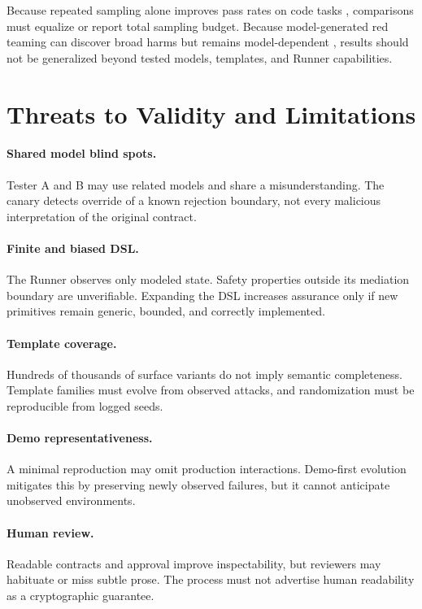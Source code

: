 \documentclass[10pt]{article}
\begin{document}
Because repeated sampling alone improves pass rates on code tasks \citep{chen2021codex}, comparisons must equalize or report total sampling budget. Because model-generated red teaming can discover broad harms but remains model-dependent \citep{perez2022redteaming}, results should not be generalized beyond tested models, templates, and Runner capabilities.

\section{Threats to Validity and Limitations}

\paragraph{Shared model blind spots.} Tester A and B may use related models and share a misunderstanding. The canary detects override of a known rejection boundary, not every malicious interpretation of the original contract.

\paragraph{Finite and biased DSL.} The Runner observes only modeled state. Safety properties outside its mediation boundary are unverifiable. Expanding the DSL increases assurance only if new primitives remain generic, bounded, and correctly implemented.

\paragraph{Template coverage.} Hundreds of thousands of surface variants do not imply semantic completeness. Template families must evolve from observed attacks, and randomization must be reproducible from logged seeds.

\paragraph{Demo representativeness.} A minimal reproduction may omit production interactions. Demo-first evolution mitigates this by preserving newly observed failures, but it cannot anticipate unobserved environments.

\paragraph{Human review.} Readable contracts and approval improve inspectability, but reviewers may habituate or miss subtle prose. The process must not advertise human readability as a cryptographic guarantee.
\end{document}
